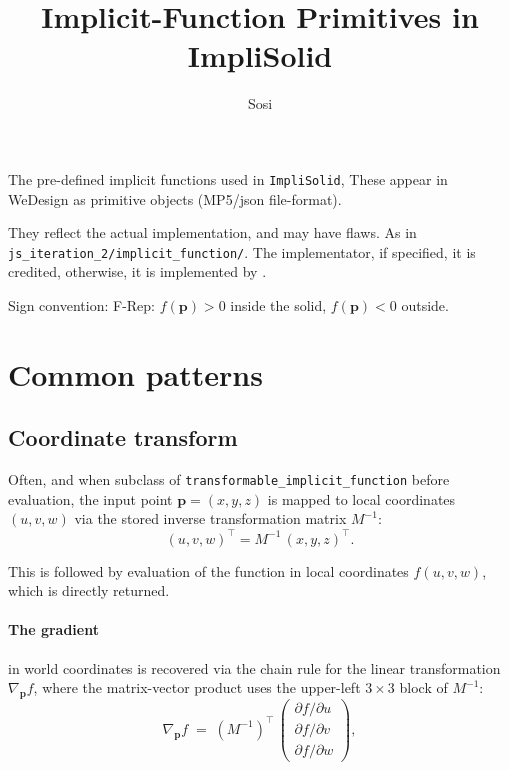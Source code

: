 \documentclass{article}
\title{Implicit-Function Primitives in ImpliSolid}
\author{Sosi}
\date{}
\begin{document}
\maketitle

\noindent The pre-defined implicit functions used in \texttt{ImpliSolid},
These appear in WeDesign as primitive objects (MP5/json file-format).

\noindent
They reflect the actual implementation, and may have flaws.
As in \texttt{js\_iteration\_2/implicit\_function/}.
The implementator, if specified, it is credited, otherwise, it is implemented by \cite{sosi:implisolid}.

\noindent
Sign convention: F-Rep:
$f(\mathbf{p}) > 0$ inside the solid, $f(\mathbf{p}) < 0$ outside.

\section{Common patterns}
\subsection{Coordinate transform}

Often,
and when subclass of \texttt{transformable\_implicit\_function}
before evaluation,
the input point $\mathbf{p} = (x,y,z)$ is mapped to local coordinates $(u,v,w)$
via the stored inverse transformation matrix $M^{-1}$:
\begin{equation}
\label{eq:common:homogenous-transform:pre}%
  (u, v, w)^\top = M^{-1}\, (x, y, z)^\top .
\end{equation}

This is followed by evaluation of the function in local coordinates $f(u,v,w)$,
which is directly returned.

\label{common:homogenic-transform:gradient-chain-rule-output}
\paragraph{The gradient} in world coordinates is recovered via the chain rule for the
linear transformation $\nabla_{\mathbf{p}} f$,
where the matrix-vector product uses the upper-left $3\times 3$ block of $M^{-1}$:
\begin{equation}
  \nabla_{\mathbf{p}} f
  \;=\;
  (M^{-1})^\top \,
  \begin{pmatrix} \partial f/\partial u \\ \partial f/\partial v \\ \partial f/\partial w \end{pmatrix} ,
\end{equation}
\end{document}
